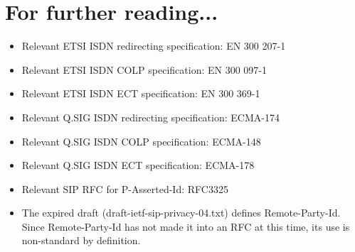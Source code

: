 \section{For further reading...}
\begin{itemize}

\item Relevant ETSI ISDN redirecting specification: EN 300 207-1

\item Relevant ETSI ISDN COLP specification: EN 300 097-1

\item Relevant ETSI ISDN ECT specification: EN 300 369-1

\item Relevant Q.SIG ISDN redirecting specification: ECMA-174

\item Relevant Q.SIG ISDN COLP specification: ECMA-148

\item Relevant Q.SIG ISDN ECT specification: ECMA-178

\item Relevant SIP RFC for P-Asserted-Id: RFC3325

\item The expired draft (draft-ietf-sip-privacy-04.txt) defines
Remote-Party-Id.  Since Remote-Party-Id has not made it into an RFC at
this time, its use is non-standard by definition.

\end{itemize}
